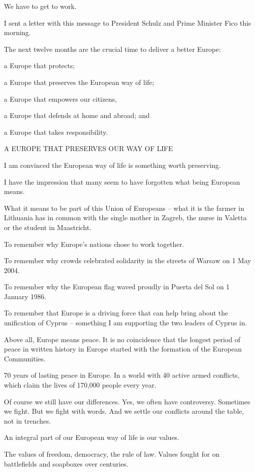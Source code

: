 \documentclass[a4paper,11pt]{article}
\begin{document}
We have to get to work.

I sent a letter with this message to President Schulz and Prime Minister Fico this morning.

The next twelve months are the crucial time to deliver a better Europe:

a Europe that protects;

a Europe that preserves the European way of life;

a Europe that empowers our citizens,

a Europe that defends at home and abroad; and

a Europe that takes responsibility.

 

A EUROPE THAT PRESERVES OUR WAY OF LIFE

I am convinced the European way of life is something worth preserving.

I have the impression that many seem to have forgotten what being European means.

What it means to be part of this Union of Europeans – what it is the farmer in Lithuania has in common with the single mother in Zagreb, the nurse in Valetta or the student in Maastricht.

To remember why Europe's nations chose to work together.

To remember why crowds celebrated solidarity in the streets of Warsaw on 1 May 2004.

To remember why the European flag waved proudly in Puerta del Sol on 1 January 1986.

To remember that Europe is a driving force that can help bring about the unification of Cyprus – something I am supporting the two leaders of Cyprus in.

Above all, Europe means peace. It is no coincidence that the longest period of peace in written history in Europe started with the formation of the European Communities.

70 years of lasting peace in Europe. In a world with 40 active armed conflicts, which claim the lives of 170,000 people every year.

Of course we still have our differences. Yes, we often have controversy. Sometimes we fight. But we fight with words. And we settle our conflicts around the table, not in trenches.

An integral part of our European way of life is our values.

The values of freedom, democracy, the rule of law. Values fought for on battlefields and soapboxes over centuries.
\end{document}
